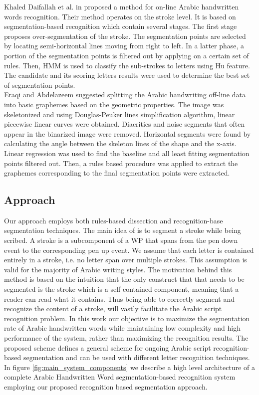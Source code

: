 \documentclass[journal,compsoc]{IEEEtran}
\begin{document}
Khaled Daifallah et al. in \cite{daifallah2009recognition} proposed a method for on-line Arabic handwritten words recognition. Their method operates on the stroke level. It is based on segmentation-based recognition which contain several stages. The first stage proposes over-segmentation of the stroke. The segmentation points are selected by locating semi-horizontal lines moving from right to left. In a latter phase, a portion of the segmentation points is filtered out by applying on a certain set of rules. Then, HMM is used to classify the sub-strokes to letters using Hu feature. The candidate and its scoring letters results were used to determine the best set of segmentation points. \\

Eraqi and Abdelazeem \cite{eraqi2012new} suggested splitting the Arabic handwriting off-line data into basic graphemes based on the geometric properties. The image was skeletonized and using Douglas-Peuker lines simplification algorithm, linear piecewise linear curves were obtained. Diacritics and noise segments that often appear in the binarized image were removed. Horizontal segments were found by calculating the angle between the skeleton lines of the shape and the x-axis. Linear regression was used to find the baseline and all least fitting segmentation points filtered out. Then, a rules based procedure was applied to extract the graphemes corresponding to the final segmentation points were extracted.    

\subsection{Approach}
Our approach employs both rules-based dissection and recognition-base segmentation techniques. The main idea of is to  segment a stroke while being scribed. A stroke is a subcomponent of a WP that spans from the pen down event to the corresponding pen up event. We assume that each letter is contained entirely in a stroke, i.e. no letter span over multiple strokes. This assumption is valid for the majority of Arabic writing styles. The motivation behind this method is based on the intuition that the only construct that that needs to be segmented is the stroke which is a self contained component, meaning that a reader can read what it contains. Thus being able to correctly segment and recognize the content of a stroke, will vastly facilitate the Arabic script recognition problem. In this work our objective is to maximize the segmentation rate of Arabic handwritten words while maintaining low complexity and high performance of the system, rather than maximizing the recognition results. 
The proposed scheme defines a general scheme for ongoing Arabic script recognition-based segmentation and can be used with different letter recognition techniques. In figure \ref{fig:main_system_components} we describe a high level architecture of a complete Arabic Handwritten Word segmentation-based recognition system employing our proposed recognition based segmentation approach. 
  
\end{document}
